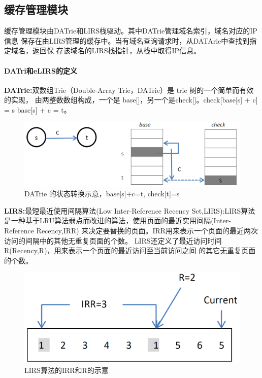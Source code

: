 

\subsection{缓存管理模块} 

\par{缓存管理模块由DATrie和LIRS栈驱动。其中DATrie管理域名索引，域名对应的IP信息
保存在由LIRS管理的缓存中。当有域名查询请求时，从DATArie中查找到指定域名，返回保
存该域名的LIRS栈指针，从栈中取得IP信息。}


\paragraph{DATri和eLIRS的定义\\[5pt]}
\par{\textbf{DATrie:}双数组Trie（Double-Array  Trie，DATrie）是 trie 树的一个简单而有效的实现，
由两整数数组构成，一个是 base[]，另一个是check[]。check[base[s] + c] = s base[s] + c = t。
}

\begin{figure}[H]
\centering
\includegraphics[keepaspectratio, scale=0.4]{pitures/aaa.png}
\caption{ DATrie 的状态转换示意，base[s]+c=t, check[t]=s } 
\end{figure}

\par{\textbf{LIRS:}最短最近使用间隔算法(Low  Inter-Reference  Recency Set,LIRS):LIRS算法
	是一种基于LRU算法弱点而改进的算法，使用页面的最近实用间隔(Inter-Reference Recency,IRR)
	来决定要替换的页面。IRR用来表示一个页面的最近两次访问的间隔中的其他无重复页面的个数。
	LIRS还定义了最近访问时间R(Recency,R)，用来表示一个页面的最近访问至当前访问之间
	的其它无重复页面的个数。
}

\begin{figure}[H]
\centering
\includegraphics[keepaspectratio, scale=0.4]{pitures/irr.png}
\caption{LIRS算法的IRR和R的示意} 
\end{figure}

